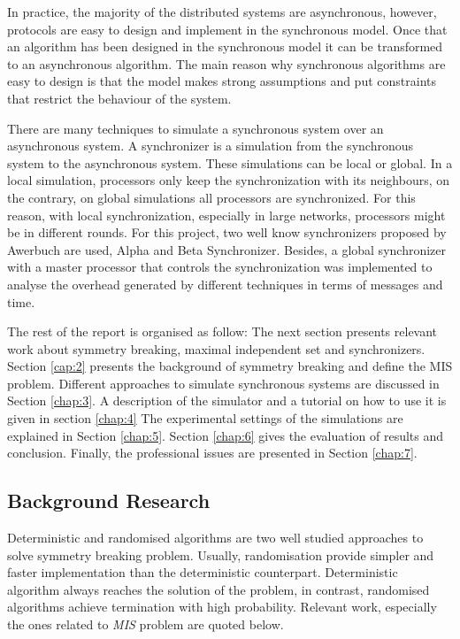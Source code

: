 In practice, the majority of the distributed systems are asynchronous, however, protocols are easy to design and implement in the synchronous model. Once that an algorithm has been designed in the synchronous model it can be transformed to an asynchronous algorithm.  The main reason why synchronous algorithms are easy to design is that the model makes strong assumptions and put constraints that restrict the behaviour of the system.


There are many techniques to simulate a synchronous system over an asynchronous system. A synchronizer is a simulation from the synchronous system to the asynchronous system. These simulations can be local or global. In a local simulation, processors only keep the synchronization with its neighbours, on the contrary, on global simulations all processors are synchronized.  For this reason, with local synchronization, especially in large networks, processors might be in different rounds. For this project, two well know synchronizers proposed by Awerbuch \cite{awerbuch1985complexity} are used, Alpha and Beta Synchronizer. Besides, a global synchronizer with a master processor that controls the synchronization was implemented to analyse the overhead generated by different techniques in terms of messages and time.




The rest of the report is organised as follow: The next section presents relevant work about symmetry breaking, maximal independent set and synchronizers. Section \ref{cap:2} presents the background of symmetry breaking and define the MIS problem. Different approaches to simulate synchronous systems are discussed in Section \ref{chap:3}. A description of the simulator and a tutorial on how to use it is given in section \ref{chap:4} The experimental settings of the simulations are explained in Section \ref{chap:5}. Section \ref{chap:6} gives the evaluation of results and conclusion. Finally, the professional issues are presented in Section \ref{chap:7}. 

\subsection{Background Research}
 
Deterministic and randomised algorithms are two well studied approaches to solve symmetry breaking problem. Usually, randomisation provide simpler and faster implementation than the deterministic counterpart. Deterministic algorithm always reaches the solution of the problem, in contrast, randomised algorithms achieve termination with high probability. Relevant work, especially the ones related to \textit{MIS} problem are quoted below.

